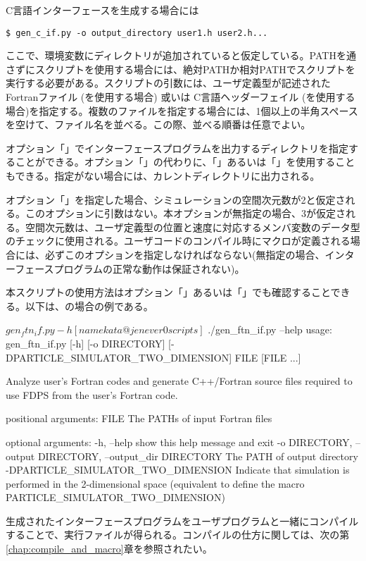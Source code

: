 C言語インターフェースを生成する場合には
\begin{screen}
\begin{Verbatim}[commandchars=\\\{\}]
$ gen_c_if.py -o output_directory user1.h user2.h... 
\end{Verbatim}
\end{screen}

ここで、環境変数にディレクトリが追加されていると仮定している。PATHを通さずにスクリプトを使用する場合には、絶対PATHか相対PATHでスクリプトを実行する必要がある。スクリプトの引数には、ユーザ定義型が記述されたFortranファイル {\small (を使用する場合)} 或いは C言語ヘッダーフェイル {\small (を使用する場合)}を指定する。複数のファイルを指定する場合には、1個以上の半角スペースを空けて、ファイル名を並べる。この際、並べる順番は任意でよい。

オプション「」でインターフェースプログラムを出力するディレクトリを指定することができる。オプション「」の代わりに、「」あるいは「」を使用することもできる。指定がない場合には、カレントディレクトリに出力される。

オプション「」を指定した場合、シミュレーションの空間次元数が2と仮定される。このオプションに引数はない。本オプションが無指定の場合、3が仮定される。空間次元数は、ユーザ定義型の位置と速度に対応するメンバ変数のデータ型のチェックに使用される。ユーザコードのコンパイル時にマクロが定義される場合には、必ずこのオプションを指定しなければならない(無指定の場合、インターフェースプログラムの正常な動作は保証されない)。

本スクリプトの使用方法はオプション「」あるいは「」でも確認することできる。以下は、の場合の例である。
\begin{screen}
\begin{spverbatim}
$ gen_ftn_if.py -h
[namekata@jenever0 scripts]$ ./gen_ftn_if.py --help
usage: gen_ftn_if.py [-h] [-o DIRECTORY] [-DPARTICLE_SIMULATOR_TWO_DIMENSION]
                     FILE [FILE ...]

Analyze user's Fortran codes and generate C++/Fortran source files required to use FDPS from the user's Fortran code.

positional arguments:
  FILE                  The PATHs of input Fortran files

optional arguments:
  -h, --help            show this help message and exit
  -o DIRECTORY, --output DIRECTORY, --output_dir DIRECTORY
                        The PATH of output directory
  -DPARTICLE_SIMULATOR_TWO_DIMENSION
                        Indicate that simulation is performed
                        in the 2-dimensional space (equivalent
                        to define the macro 
                        PARTICLE_SIMULATOR_TWO_DIMENSION)
\end{spverbatim}
\end{screen}


生成されたインターフェースプログラムをユーザプログラムと一緒にコンパイルすることで、実行ファイルが得られる。コンパイルの仕方に関しては、次の第\ref{chap:compile_and_macro}章を参照されたい。


